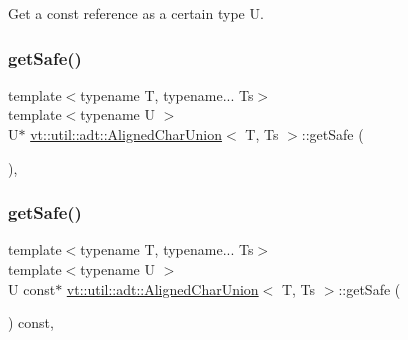 Get a const reference as a certain type {\ttfamily U}. 

\mbox{\label{structvt_1_1util_1_1adt_1_1_aligned_char_union_a58c0d0aaf061c92a89b33da6e84ea5d7}} 
\subsubsection{\texorpdfstring{get\+Safe()}{getSafe()}\hspace{0.1cm}{\footnotesize\ttfamily [1/2]}}
{\footnotesize\ttfamily template$<$typename T, typename... Ts$>$ \\
template$<$typename U $>$ \\
U$\ast$ \hyperlink{structvt_1_1util_1_1adt_1_1_aligned_char_union}{vt\+::util\+::adt\+::\+Aligned\+Char\+Union}$<$ T, Ts $>$\+::get\+Safe (\begin{DoxyParamCaption}{ }\end{DoxyParamCaption})\hspace{0.3cm}{\ttfamily [inline]}, {\ttfamily [private]}}

\mbox{\label{structvt_1_1util_1_1adt_1_1_aligned_char_union_a188460ee37c49aa3134d84ae728a2783}} 
\subsubsection{\texorpdfstring{get\+Safe()}{getSafe()}\hspace{0.1cm}{\footnotesize\ttfamily [2/2]}}
{\footnotesize\ttfamily template$<$typename T, typename... Ts$>$ \\
template$<$typename U $>$ \\
U const$\ast$ \hyperlink{structvt_1_1util_1_1adt_1_1_aligned_char_union}{vt\+::util\+::adt\+::\+Aligned\+Char\+Union}$<$ T, Ts $>$\+::get\+Safe (\begin{DoxyParamCaption}{ }\end{DoxyParamCaption}) const\hspace{0.3cm}{\ttfamily [inline]}, {\ttfamily [private]}}

